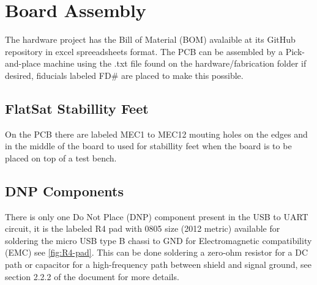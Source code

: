 %
%
%
%
%

%
%
%
%
%
%

\chapter{Board Assembly}

The hardware project has the Bill of Material (BOM) avalaible at its GitHub repository in excel spreeadsheets format. The PCB can be assembled by a Pick-and-place machine using the .txt file found on the hardware/fabrication folder if desired, fiducials labeled FD\# are placed to make this possible.

\section{FlatSat Stabillity Feet}

On the PCB there are labeled MEC1 to MEC12 mouting holes on the edges and in the middle of the board to used for stabillity feet when the board is to be placed on top of a test bench.

\section{DNP Components}

There is only one Do Not Place (DNP) component present in the USB to UART circuit, it is the labeled R4 pad with 0805 size (2012 metric) available for soldering the micro USB type B chassi to GND for Electromagnetic compatibility (EMC) see \ref{fig:R4-pad}. This can be done soldering a zero-ohm resistor for a DC path or capacitor for a high-frequency path between shield and signal ground, see section 2.2.2 of the document \cite{ftdi-usb-hardware-guidelines} for more details.

